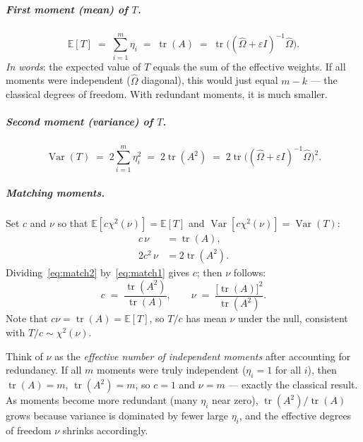 \subparagraph{First moment (mean) of $T$.}
\begin{equation}
  \mathbb{E}[T]
    \;=\; \sum_{i=1}^{m}\eta_i
    \;=\; \operatorname{tr}(A)
    \;=\; \operatorname{tr}\!\bigl((\hat\Omega+\varepsilon I)^{-1}\hat\Omega\bigr).
  \label{eq:ET}
\end{equation}
\textit{In words}: the expected value of $T$ equals the sum of the
effective weights.  If all moments were independent ($\hat\Omega$
diagonal), this would just equal $m - k$ --- the classical degrees
of freedom.  With redundant moments, it is much smaller.

\subparagraph{Second moment (variance) of $T$.}
\begin{equation}
  \operatorname{Var}(T)
    \;=\; 2\sum_{i=1}^{m}\eta_i^2
    \;=\; 2\operatorname{tr}(A^2)
    \;=\; 2\operatorname{tr}\!\bigl((\hat\Omega+\varepsilon I)^{-1}\hat\Omega\bigr)^2.
  \label{eq:VarT}
\end{equation}

\subparagraph{Matching moments.}
Set $c$ and $\nu$ so that $\mathbb{E}[c\chi^2(\nu)] = \mathbb{E}[T]$
and $\operatorname{Var}[c\chi^2(\nu)] = \operatorname{Var}(T)$:
\begin{align}
  c\,\nu       &= \operatorname{tr}(A),                  \label{eq:match1}\\
  2c^2\,\nu    &= 2\operatorname{tr}(A^2).                \label{eq:match2}
\end{align}
Dividing~\eqref{eq:match2} by~\eqref{eq:match1} gives $c$; then $\nu$
follows:
\begin{equation}
  \boxed{
    c \;=\; \frac{\operatorname{tr}(A^2)}{\operatorname{tr}(A)},
    \qquad
    \nu \;=\; \frac{\bigl[\operatorname{tr}(A)\bigr]^2}{\operatorname{tr}(A^2)}.
  }
  \label{eq:cnu}
\end{equation}
Note that $c\nu = \operatorname{tr}(A) = \mathbb{E}[T]$, so $T/c$ has
mean $\nu$ under the null, consistent with $T/c \sim \chi^2(\nu)$.

\medskip
\begin{tcolorbox}[colback=gray!8, colframe=gray!40,
  title=Intuition behind $c$ and $\nu$]
Think of $\nu$ as the \emph{effective number of independent moments}
after accounting for redundancy.  If all $m$ moments were truly
independent ($\eta_i = 1$ for all $i$), then $\operatorname{tr}(A)=m$,
$\operatorname{tr}(A^2)=m$, so $c=1$ and $\nu=m$ --- exactly the
classical result.  As moments become more redundant (many $\eta_i$
near zero), $\operatorname{tr}(A^2)/\operatorname{tr}(A)$ grows because
variance is dominated by fewer large $\eta_i$, and the effective degrees
of freedom $\nu$ shrinks accordingly.
\end{tcolorbox}

